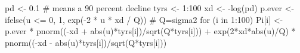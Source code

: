 \begin{Schunk}
\begin{Sinput}
 pd <- 0.1 # means a 90 percent decline
 tyrs <- 1:100
 xd <- -log(pd)
 p.ever <- ifelse(u <= 0, 1, exp(-2 * u * xd / Q)) # Q=sigma2
 for (i in 1:100) {
   Pi[i] <- p.ever * pnorm((-xd + abs(u)*tyrs[i])/sqrt(Q*tyrs[i])) +
     exp(2*xd*abs(u)/Q) * pnorm((-xd - abs(u)*tyrs[i])/sqrt(Q*tyrs[i]))
 }
\end{Sinput}
\end{Schunk}
